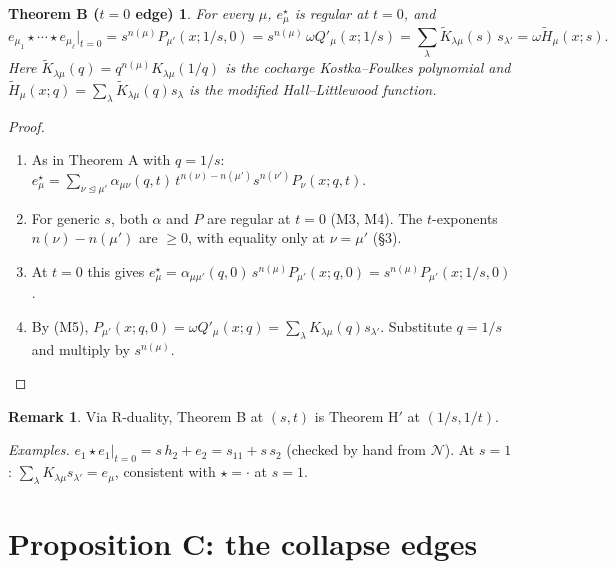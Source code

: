 \documentclass[11pt]{article}
\newtheorem*{theoremB}{Theorem B ($t=0$ edge)}
\theoremstyle{definition}
\newtheorem*{remark}{Remark}
\newcommand{\cN}{\mathcal{N}}
\newcommand{\domd}{\trianglelefteq}
\newcommand{\Ht}{\widetilde{H}}
\newcommand{\Kt}{\widetilde{K}}
\begin{document}
\begin{theoremB}
For every $\mu$, $e^\star_\mu$ is regular at $t=0$, and
\[
e_{\mu_1}\star\cdots\star e_{\mu_\ell}\big|_{t=0}
= s^{n(\mu)}P_{\mu'}(x;1/s,0)
= s^{n(\mu)}\,\omega Q'_\mu(x;1/s)
=\sum_\lambda \Kt_{\lambda\mu}(s)\,s_{\lambda'}
=\omega\Ht_\mu(x;s).
\]
Here $\Kt_{\lambda\mu}(q)=q^{n(\mu)}K_{\lambda\mu}(1/q)$ is the cocharge Kostka--Foulkes polynomial and \mbox{$\Ht_\mu(x;q)=\sum_\lambda\Kt_{\lambda\mu}(q)s_\lambda$} is the modified Hall--Littlewood function.
\end{theoremB}
\begin{proof}
\begin{enumerate}[nosep]
\item As in Theorem A with $q=1/s$: $e^\star_\mu=\sum_{\nu\domd\mu'}\alpha_{\mu\nu}(q,t)\,t^{n(\nu)-n(\mu')}s^{n(\nu')}P_\nu(x;q,t)$.
\item For generic $s$, both $\alpha$ and $P$ are regular at $t=0$ (M3, M4). The $t$-exponents $n(\nu)-n(\mu')$ are $\ge0$, with equality only at $\nu=\mu'$ (\S3).
\item At $t=0$ this gives $e^\star_\mu=\alpha_{\mu\mu'}(q,0)\,s^{n(\mu)}P_{\mu'}(x;q,0)=s^{n(\mu)}P_{\mu'}(x;1/s,0)$.
\item By (M5), $P_{\mu'}(x;q,0)=\omega Q'_\mu(x;q)=\sum_\lambda K_{\lambda\mu}(q)s_{\lambda'}$. Substitute $q=1/s$ and multiply by $s^{n(\mu)}$.\qedhere
\end{enumerate}
\end{proof}
\begin{remark}
Via R-duality, Theorem B at $(s,t)$ is Theorem H$'$ at $(1/s,1/t)$.

\emph{Examples.} $e_1\star e_1|_{t=0}=s\,h_2+e_2=s_{11}+s\,s_2$ (checked by hand from $\cN$). At $s=1$: $\sum_\lambda K_{\lambda\mu}s_{\lambda'}=e_\mu$, consistent with $\star=\cdot$ at $s=1$.
\end{remark}

\section{Proposition C: the collapse edges}
\end{document}
